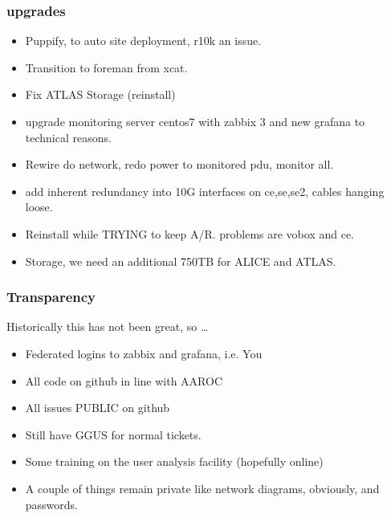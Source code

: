 \documentclass{beamer}
\begin{document}
\begin{frame}
  \frametitle{upgrades}
  \begin{itemize}
    \item Puppify, to auto site deployment, r10k an issue.
    \item Transition to foreman from xcat.
    \item Fix ATLAS Storage (reinstall)
    \item upgrade monitoring server centos7 with zabbix 3 and new grafana to technical reasons.
    \item Rewire do network, redo power to monitored pdu, monitor all.
    \item add inherent redundancy into 10G interfaces on ce,se,se2, cables hanging loose.
    \item Reinstall while TRYING to keep A/R. problems are vobox and ce. 
    \item Storage, we need an additional 750TB for ALICE and ATLAS.
  \end{itemize}
\end{frame}
\begin{frame}
  \frametitle{Transparency}
  Historically this has not been great, so \ldots
  \begin{itemize}
    \item Federated logins to zabbix and grafana, i.e. You
    \item All code on github in line with AAROC
    \item All issues PUBLIC on github
    \item Still have GGUS for normal tickets.
    \item Some training on the user analysis facility (hopefully online)
    \item A couple of things remain private like network diagrams, obviously, and passwords.
  \end{itemize}
\end{frame}
\end{document}
